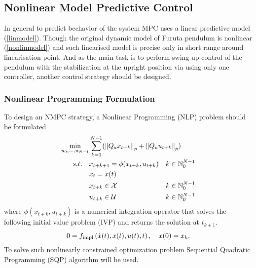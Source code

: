 \subsection{Nonlinear Model Predictive Control}
In general to predict bechavior of the system MPC uses a linear predictive model (\ref{linmodel}). Though the original dynamic model of Furuta pendulum is nonlinear (\ref{nonlinmodel}) and such linearised model is precise only in short range around linearisation point. And as the main task is to perform swing-up control of the pendulum with the stabilization at the upright position via using only one controller, another control strategy should be designed.
\subsubsection{Nonlinear Programming Formulation}
To design an NMPC strategy, a Nonlinear Programming (NLP) problem should be formulated
\begin{subequations}\label{NLP}
	\begin{align}
	\min_{u_0,...,u_{N-1}} &\sum_{k=0}^{N-1} (\left\| Q _{\text{x}}x_{t+k}\right\|_p+\left\|Q _{\text{u}}u_{t+k}\right\|_p)\\
	s.t.\quad&x_{t+k+1} = \phi(x_{t+k},u_{t+k})\quad k \in \mathbb{N}_0^{N-1}\\
	&x_t = x(t)\\
	&x_{t+k}\in\mathcal{X}\qquad\qquad\qquad\quad\!\: k \in \mathbb{N}_0^{N-1}\\
	&u_{t+k}\in\mathcal{U}\qquad\qquad\qquad\quad\, k \in \mathbb{N}_0^{N-1}
	\end{align}
\end{subequations}
where $\phi(x_{t+k},u_{t+k})$ is a numerical integration operator that solves the following initial value problem (IVP) and returns the solution at $t_{k+1}$.
\begin{equation}
0=f _{\text{impl}}\left( \dot{x}(t), x(t),u(t),t \right),\quad x(0)=x_k.
\end{equation}
To solve such nonlinearly constrained optimization problem Sequential Quadratic Programming (SQP) algorithm will be used.
